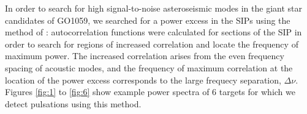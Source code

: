 In order to search for high signal-to-noise asteroseismic modes in the giant
star candidates of GO1059, we searched for a power excess in the SIPs using the
method of \citet{Huber2009}: autocorrelation functions were calculated for
sections of the SIP in order to search for regions of increased
correlation and locate the frequency of maximum power.
The increased correlation arises from the even frequency spacing of acoustic
modes, and the frequency of maximum correlation at the location of the power
excess corresponds to the large frequecy separation, $\Delta\nu$.
Figures \ref{fig:1} to \ref{fig:6} show example power spectra of 6 targets for
which we detect pulsations using this method.

\begin{figure}
\begin{center}
\end{center}
\end{figure}
